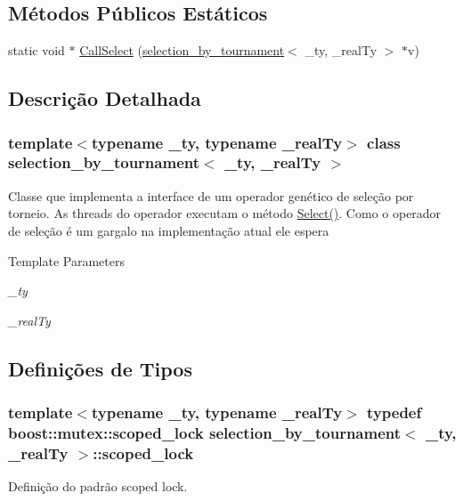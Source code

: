 \subsection*{Métodos Públicos Estáticos}
\begin{DoxyCompactItemize}
\item 
static void $\ast$ \hyperlink{classselection__by__tournament_ad754f7c3afa1443bfed139265cd506c1}{CallSelect} (\hyperlink{classselection__by__tournament}{selection\_\-by\_\-tournament}$<$ \_\-ty, \_\-realTy $>$ $\ast$v)
\end{DoxyCompactItemize}


\subsection{Descrição Detalhada}
\subsubsection*{template$<$typename \_\-ty, typename \_\-realTy$>$ class selection\_\-by\_\-tournament$<$ \_\-ty, \_\-realTy $>$}

Classe que implementa a interface de um operador genético de seleção por torneio. As threads do operador executam o método \hyperlink{classselection__by__tournament_aa2a32fdcbd6365eea3e40a565c9cff3a}{Select()}. Como o operador de seleção é um gargalo na implementação atual ele espera


\begin{DoxyTemplParams}{Template Parameters}
\item[{\em \_\-ty}]\item[{\em \_\-realTy}]\end{DoxyTemplParams}


\subsection{Definições de Tipos}
\hypertarget{classselection__by__tournament_a0ba2a47db6a59696b51f19341719c3fd}{
\subsubsection[{scoped\_\-lock}]{\setlength{\rightskip}{0pt plus 5cm}template$<$typename \_\-ty, typename \_\-realTy$>$ typedef boost::mutex::scoped\_\-lock {\bf selection\_\-by\_\-tournament}$<$ \_\-ty, \_\-realTy $>$::{\bf scoped\_\-lock}}}
\label{classselection__by__tournament_a0ba2a47db6a59696b51f19341719c3fd}
Definição do padrão scoped lock. 


